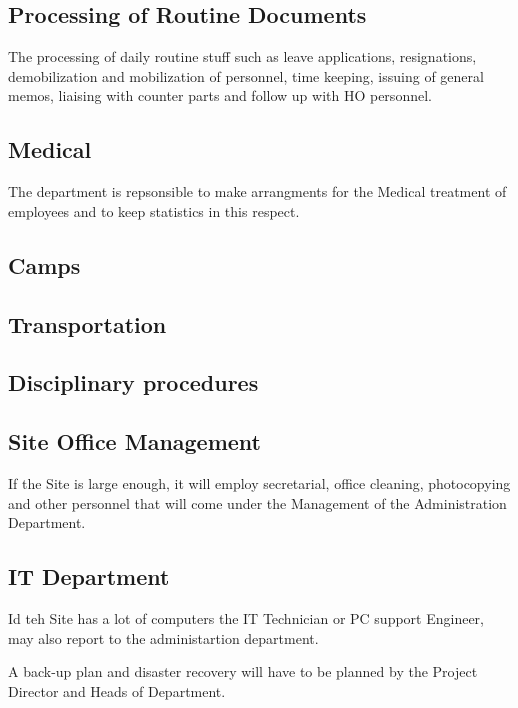 \subsection*{Processing of Routine Documents}

The processing of daily routine stuff such as leave applications, resignations, demobilization and 
mobilization of personnel, time keeping, issuing of general memos, liaising with counter parts and follow up
with HO personnel.

\subsection*{Medical}

The department is repsonsible to make arrangments for the Medical treatment of employees and to keep
statistics in this respect.

\subsection*{Camps}

\subsection*{Transportation}

\subsection*{Disciplinary procedures}

\subsection*{Site Office Management}

If the Site is large enough, it will employ secretarial, office cleaning, photocopying and other personnel that
will come under the Management of the Administration Department.

\subsection{IT Department}

Id teh Site has a lot of computers the IT Technician or PC support Engineer, may also report
to the administartion department.

A back-up plan and disaster recovery will have to be planned by the Project Director and Heads of
Department.

